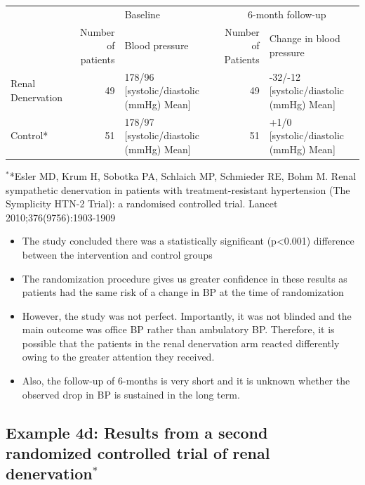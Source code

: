 \documentclass[
]{book}
\providecommand{\tightlist}{%
  \setlength{\itemsep}{0pt}\setlength{\parskip}{0pt}}
\begin{document}
\begin{table}
\centering
\begin{tabular}{l|r|l|r|l}
\hline
\multicolumn{1}{c|}{ } & \multicolumn{2}{c|}{Baseline} & \multicolumn{2}{c}{6-month follow-up} \\
\cline{2-3} \cline{4-5}
  & Number of patients & Blood pressure & Number of Patients & Change in blood pressure\\
\hline
Renal Denervation & 49 & 178/96 [systolic/diastolic (mmHg) Mean] & 49 & -32/-12 [systolic/diastolic (mmHg) Mean]\\
\hline
Control* & 51 & 178/97 [systolic/diastolic (mmHg) Mean] & 51 & +1/0 [systolic/diastolic (mmHg) Mean]\\
\hline
\end{tabular}
\end{table}

\(^*\)*Esler MD, Krum H, Sobotka PA, Schlaich MP, Schmieder RE, Bohm M. Renal sympathetic denervation in patients with treatment-resistant hypertension (The Symplicity HTN-2 Trial): a randomised controlled trial. Lancet 2010;376(9756):1903-1909

\begin{itemize}
\tightlist
\item
  The study concluded there was a statistically significant (p\textless0.001) difference between the intervention and control groups
\item
  The randomization procedure gives us greater confidence in these results as patients had the same risk of a change in BP at the time of randomization
\item
  However, the study was not perfect. Importantly, it was not blinded and the main outcome was office BP rather than ambulatory BP. Therefore, it is possible that the patients in the renal denervation arm reacted differently owing to the greater attention they received.
\item
  Also, the follow-up of 6-months is very short and it is unknown whether the observed drop in BP is sustained in the long term.
\end{itemize}

\hypertarget{example-4d-results-from-a-second-randomized-controlled-trial-of-renal-denervation}{%
\subsection{\texorpdfstring{Example 4d: Results from a second randomized controlled trial of renal denervation\(^*\)}{Example 4d: Results from a second randomized controlled trial of renal denervation\^{}*}}\label{example-4d-results-from-a-second-randomized-controlled-trial-of-renal-denervation}}
\end{document}
